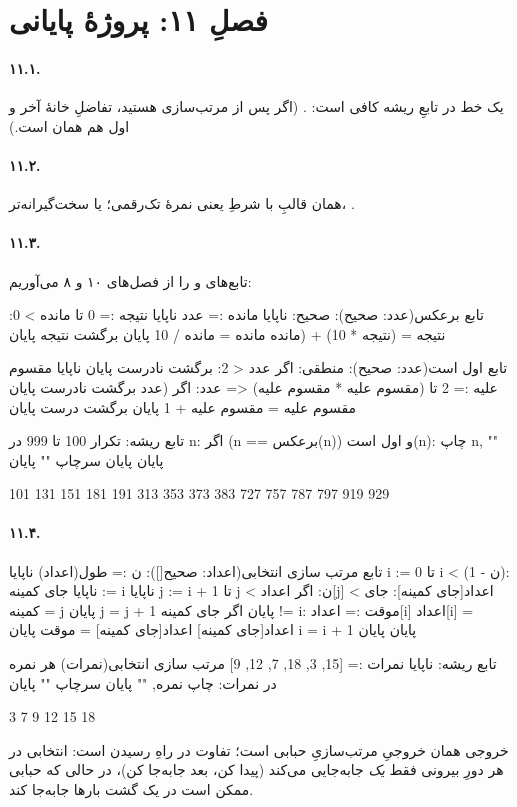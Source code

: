 \section*{فصلِ ۱۱: پروژهٔ پایانی}

\paragraph{۱۱.۱.} یک خط در تابعِ ریشه کافی است:
.
(اگر پس از مرتب‌سازی هستید، تفاضلِ خانهٔ آخر و اول هم همان است.)

\paragraph{۱۱.۲.} همان قالبِ  با شرطِ
 یعنی نمرهٔ تک‌رقمی؛ یا سخت‌گیرانه‌تر،
.

\paragraph{۱۱.۳.}
تابع‌های  و  را از فصل‌های ۱۰ و ۸ می‌آوریم:
\begin{salamfa}
تابع برعکس(عدد: صحیح): صحیح:
    ناپایا مانده := عدد
    ناپایا نتیجه := 0
    تا مانده > 0:
        نتیجه = (نتیجه * 10) + (مانده %
        مانده = مانده / 10
    پایان
    برگشت نتیجه
پایان

تابع اول است(عدد: صحیح): منطقی:
    اگر عدد < 2:
        برگشت نادرست
    پایان
    ناپایا مقسوم علیه := 2
    تا (مقسوم علیه * مقسوم علیه) <= عدد:
        اگر (عدد %
            برگشت نادرست
        پایان
        مقسوم علیه = مقسوم علیه + 1
    پایان
    برگشت درست
پایان

تابع ریشه:
    تکرار 100 تا 999 در n:
        اگر (n == برعکس(n)) و اول است(n):
            چاپ n, ""
        پایان
    پایان
    سرچاپ ""
پایان
\end{salamfa}

\begin{progout}
101 131 151 181 191 313 353 373 383 727 757 787 797 919 929
\end{progout}

\paragraph{۱۱.۴.}
\begin{salamfa}
تابع مرتب سازی انتخابی(اعداد: صحیح[]):
    ن := طول(اعداد)
    ناپایا i := 0
    تا i < (ن - 1):
        ناپایا جای کمینه := i
        ناپایا j := i + 1
        تا j < ن:
            اگر اعداد[j] < اعداد[جای کمینه]:
                جای کمینه = j
            پایان
            j = j + 1
        پایان
        اگر جای کمینه != i:
            موقت := اعداد[i]
            اعداد[i] = اعداد[جای کمینه]
            اعداد[جای کمینه] = موقت
        پایان
        i = i + 1
    پایان
پایان

تابع ریشه:
    ناپایا نمرات := [15, 3, 18, 7, 12, 9]
    مرتب سازی انتخابی(نمرات)
    هر نمره در نمرات:
        چاپ نمره, ""
    پایان
    سرچاپ ""
پایان
\end{salamfa}

\begin{progout}
3 7 9 12 15 18
\end{progout}
خروجی همان خروجیِ مرتب‌سازیِ حبابی است؛ تفاوت در راهِ رسیدن است:
انتخابی در هر دورِ بیرونی فقط \emph{یک} جابه‌جایی می‌کند (پیدا کن، بعد
جابه‌جا کن)، در حالی که حبابی ممکن است در یک گشت بارها جابه‌جا کند.
